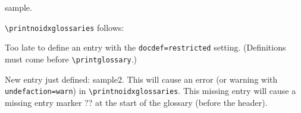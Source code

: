 \documentclass{article}
\begin{document}

\gls{sample}.

\verb|\printnoidxglossaries| follows:
\printnoidxglossaries

Too late to define an entry with the \texttt{docdef=restricted}
setting. (Definitions must come before \verb|\printglossary|.)


New entry just defined: \gls{sample2}.
This will cause an error (or warning with \texttt{undefaction=warn})
in \verb|\printnoidxglossaries|.
This missing entry will cause a missing entry marker ?? 
at the start of the glossary (before the header).
\end{document}

